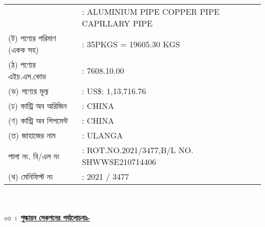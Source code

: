\documentclass[11pt]{article}
\begin{document}
\begin{tabular}{lll}
& : ALUMINIUM PIPE COPPER PIPE CAPILLARY PIPE \\
\hspace{2em} (ট) পণ্যের পরিমাণ (একক সহ)
& : 35PKGS = 19605.30 KGS \\
\hspace{2em} (ঠ) পণ্যের এইচ.এস.কোড
& : 7608.10.00 \\
\hspace{2em} (ড) পণ্যের মূল্য
& : US\$: 1,13,716.76 \\
\hspace{2em} (ঢ) কান্ট্রি অব অরিজিন
& : CHINA \\
\hspace{2em} (ণ) কান্ট্রি অব শিপমেন্ট
& : CHINA \\
\hspace{2em} (ত) জাহাজের নাম
& : ULANGA \\
\hspace{3.8em} পালা নং, বি/এল নং
& : ROT.NO.2021/3477,B/L NO. SHWWSE210714406 \\
\hspace{2em} (থ) মেনিফিস্ট নং
& : 2021 / 3477 \\
\end{tabular}
\\
\\
০৩ । \underline{\textbf{শুল্কায়ন সেকশনের পর্যালোচনাঃ-}}
\end{document}
